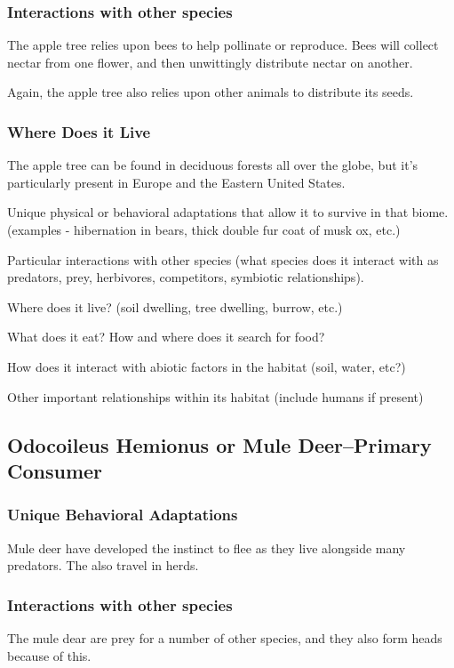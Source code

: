\documentclass[paper=a4, fontsize=11pt]{article}
\begin{document}
\subsubsection{Interactions with other species}
The apple tree relies upon bees to help pollinate or reproduce. Bees will collect nectar from one flower, and then unwittingly distribute nectar on another. 

Again, the apple tree also relies upon other animals to distribute its seeds.

\subsubsection{Where Does it Live}
The apple tree can be found in deciduous forests all over the globe, but it's particularly present in Europe and the Eastern United States.





Unique physical or behavioral adaptations that allow it to survive in that biome. (examples - hibernation in bears, thick double fur coat of musk ox, etc.)

Particular interactions with other species (what species does it interact with as predators, prey, herbivores, competitors, symbiotic relationships).

Where does it live? (soil dwelling, tree dwelling, burrow, etc.)

What does it eat? How and where does it search for food?

How does it interact with abiotic factors in the habitat (soil, water, etc?)

Other important relationships within its habitat (include humans if present)


\subsection{Odocoileus Hemionus or Mule Deer--Primary Consumer}
\subsubsection{Unique Behavioral Adaptations}
Mule deer have developed the instinct to flee as they live alongside many predators. The also travel in herds.

\subsubsection{Interactions with other species}
The mule dear are prey for a number of other species, and they also form heads because of this.
\end{document}
